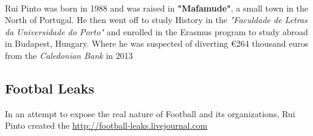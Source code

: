 \paragraph{}
Rui Pinto was born in 1988 and was raised in \textbf{"Mafamude"}, a small town in the North of Portugal.
He then went off to study History in the \textit{"Faculdade de Letras da Universidade do Porto"} and enrolled in the Erasmus program to study abroad in Budapest, Hungary.
Where he was suspected of diverting \euro{264} thousand euros from the  \textit{Caledonian Bank} in 2013

\subsection*{Footbal Leaks}
In an attempt to expose the real nature of Football and its organizations, Rui Pinto created the \url{http://football-leaks.livejournal.com}


